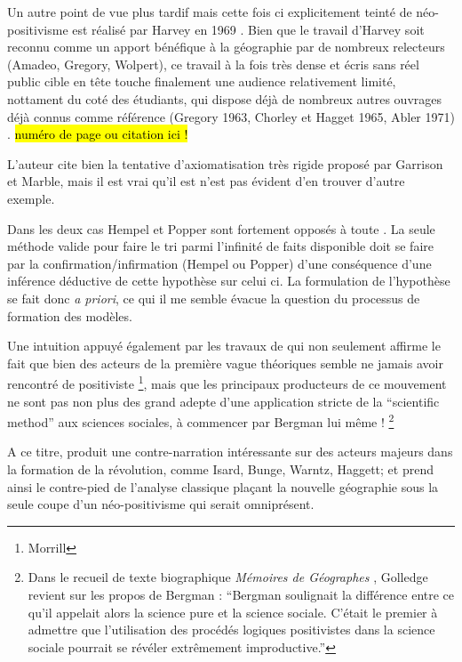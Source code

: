Un autre point de vue plus tardif mais cette fois ci explicitement teinté de néo-positivisme est réalisé par Harvey en 1969 \autocite{Harvey1969}. Bien que le travail d'Harvey soit reconnu comme un apport bénéfique à la géographie par de nombreux relecteurs (Amadeo, Gregory, Wolpert), ce travail à la fois très dense et écris sans réel public cible en tête touche finalement une audience relativement limité, nottament du coté des étudiants, qui dispose déjà de nombreux autres ouvrages déjà connus comme référence (Gregory 1963, Chorley et Hagget 1965, Abler 1971) \autocite{Johnston2008}. \hl{numéro de page ou citation ici !}

L'auteur cite bien la tentative d'axiomatisation très rigide proposé par Garrison et Marble, mais il est vrai qu'il est n'est pas évident d'en trouver d'autre exemple. 

Dans les deux cas Hempel et Popper sont fortement opposés à toute . La seule méthode valide pour faire le tri parmi l'infinité de faits disponible doit se faire par la confirmation/infirmation (Hempel ou Popper) d'une conséquence d'une inférence déductive de cette hypothèse sur celui ci. La formulation de l'hypothèse se fait donc \textit{a priori}, ce qui il me semble évacue la question du processus de formation des modèles.

Une intuition appuyé également par les travaux de \textcite{Barnes1996, Barnes2001} qui non seulement affirme le fait que bien des acteurs de la première vague théoriques semble ne jamais avoir rencontré de positiviste \footnote{Morrill}, mais que les principaux producteurs de ce mouvement ne sont pas non plus des grand adepte d'une application stricte de la \foreignquote{english}{scientific method} aux sciences sociales, à commencer par Bergman lui même ! \footnote{Dans le recueil de texte biographique \textit{Mémoires de Géographes} \textcite[96]{Bailly2000}, Golledge revient sur les propos de Bergman : \enquote{Bergman soulignait la différence entre ce qu'il appelait alors la science pure et la science sociale. C'était le premier à admettre que l'utilisation des procédés logiques positivistes dans la science sociale pourrait se révéler extrêmement improductive.} } 

A ce titre, \textcite{Barnes1996} produit une contre-narration intéressante sur des acteurs majeurs dans la formation de la révolution, comme Isard, Bunge, Warntz, Haggett; et prend ainsi le contre-pied de l'analyse classique plaçant la nouvelle géographie sous la seule coupe d'un néo-positivisme qui serait omniprésent. 

